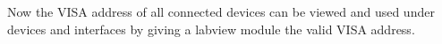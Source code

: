 \documentclass{article}
\begin{document}
\begin{enumerate}
        \vspace{.1in}
        \begin{center}
        \end{center}
        \vspace{.1in}
    \end{enumerate}
    \newpage
    
    \begin{center}
        Now the VISA address of all connected devices can be viewed and used under devices and interfaces by giving a labview module the valid VISA address.
    \end{center}
    \vspace{.1in}
        \begin{center}
        \end{center}
        \vspace{.1in}
\end{document}
